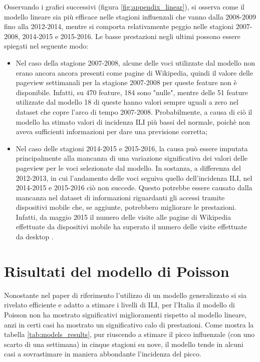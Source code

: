Osservando i grafici successivi (figura \ref{fig:appendix_linear}), si osserva come il modello lineare sia più efficace 
nelle stagioni influenzali che vanno dalla 2008-2009 fino alla 2012-2014, mentre si comporta relativamente peggio nelle 
stagioni 2007-2008, 2014-2015 e 2015-2016. Le basse prestazioni negli ultimi possono essere spiegati nel seguente modo: 
\begin{itemize}
\item Nel caso della stagione 2007-2008, alcune delle voci utilizzate dal modello non erano ancora ancora presenti come 
pagine di Wikipedia, quindi il valore delle pageview settimanali per la stagione 2007-2008 per queste feature non è 
disponibile. Infatti, su 470 feature, 184 sono "nulle", mentre delle 51 feature utilizzate dal modello 18 di queste hanno 
valori sempre uguali a zero nel dataset che copre l'arco di tempo 2007-2008. Probabilmente, a causa di ciò il modello ha 
stimato valori di incidenza ILI più bassi del normale, poichè non aveva sufficienti informazioni per dare una previsione 
corretta;
\item Nel caso delle stagioni 2014-2015 e 2015-2016, la causa può essere imputata principalmente alla mancanza di una 
variazione significativa dei valori delle pageview per le voci selezionate dal modello. In sostanza, a differenza del 
2012-2013, in cui l'andamento delle voci seguiva quello dell'incidenza ILI, nel 2014-2015 e 2015-2016 ciò non succede. 
Questo potrebbe essere causato dalla mancanza nel dataset di informazioni riguardanti gli accessi tramite dispositivi mobile 
che, se aggiunte, potrebbero migliorare le prestazioni. Infatti, da maggio 2015 il numero delle visite alle pagine di 
Wikipedia effettuate da dispositivi mobile ha superato il numero delle visite effettuate da desktop
\cite{wikipedia_mobile_desktop}.
\end{itemize}
\bigskip

\section{Risultati del modello di Poisson}
\bigskip

Nonostante nel paper di riferimento \cite{McIver2014} l'utilizzo di un modello generalizzato si sia rivelato efficiente e 
adatto a stimare i livelli di ILI, per l'Italia il modello di Poisson non ha mostrato significativi miglioramenti rispetto al 
modello lineare, anzi in certi casi ha mostrato un significativo calo di prestazioni. Come mostra la tabella 
\ref{tab:models_results}, pur riuscendo a stimare il picco influenzale (con uno scarto di una settimana) in cinque 
stagioni su nove, il modello tende in alcuni casi a sovrastimare in maniera abbondante l'incidenza del picco.
\bigskip

